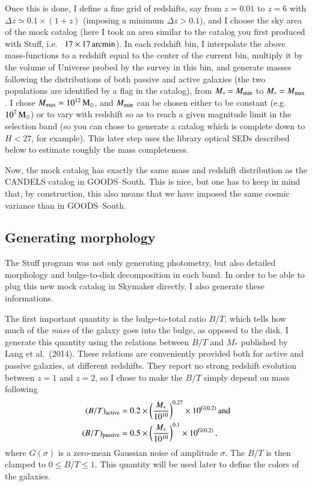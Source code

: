 \documentclass[12pt,a4paper]{article}
\newcommand{\msun}{{\rm M}_\odot}
\newcommand{\mstar}{M_\ast}
\begin{document}
Once this is done, I define a fine grid of redshifts, say from $z=0.01$ to $z=6$ with $\Delta z \simeq 0.1 \times (1 + z)$ (imposing a minimum $\Delta z > 0.1$), and I choose the sky area of the mock catalog (here I took an area similar to the catalog you first produced with Stuff, i.e.~ $17 \times 17\,{\rm arcmin}$). In each redshift bin, I interpolate the above mass-functions to a redshift equal to the center of the current bin, multiply it by the volume of Universe probed by the survey in this bin, and generate masses following the distributions of both passive and active galaxies (the two populations are identified by a flag in the catalog), from $\mstar = M_{\rm min}$ to $\mstar = M_{\rm max}$. I chose $M_{\rm max} = 10^{12}\,\msun$, and $M_{\rm min}$ can be chosen either to be constant (e.g.~$10^{7}\,\msun$) or to vary with redshift so as to reach a given magnitude limit in the selection band (so you can chose to generate a catalog which is complete down to $H < 27$, for example). This later step uses the library optical SEDs described below to estimate roughly the mass completeness.

Now, the mock catalog has exactly the same mass and redshift distribution as the CANDELS catalog in GOODS--South. This is nice, but one has to keep in mind that, by construction, this also means that we have imposed the same cosmic variance than in GOODS--South.


\subsection{Generating morphology}

The Stuff program was not only generating photometry, but also detailed morphology and bulge-to-disk decomposition in each band. In order to be able to plug this new mock catalog in Skymaker directly, I also generate these informations.

The first important quantity is the bulge-to-total ratio $B/T$, which tells how much of the \emph{mass} of the galaxy goes into the bulge, as opposed to the disk. I generate this quantity using the relations between $B/T$ and $\mstar$ published by Lang et al.~(2014). These relations are conveniently provided both for active and passive galaxies, at different redshifts. They report no strong redshift evolution between $z=1$ and $z=2$, so I chose to make the $B/T$ simply depend on mass following
\begin{align}
(B/T)_{\rm active} &= 0.2 \times \left(\frac{\mstar}{10^{10}}\right)^{0.27} \times 10^{G(0.2)}\,\text{and} \\
(B/T)_{\rm passive} &= 0.5 \times \left(\frac{\mstar}{10^{10}}\right)^{0.1} \times 10^{G(0.2)}\,,
\end{align}
where $G(\sigma)$ is a zero-mean Gaussian noise of amplitude $\sigma$. The $B/T$ is then clamped to $0 \leq B/T \leq 1$. This quantity will be used later to define the colors of the galaxies.
\end{document}
